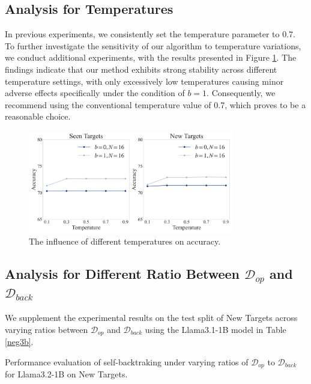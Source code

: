 \documentclass{article}
\theoremstyle{plain}
\theoremstyle{definition}
\theoremstyle{remark}
\begin{document}
\subsection{Analysis for Temperatures}
\label{app:temp}
 In previous experiments, we consistently set the temperature parameter to 0.7. To further investigate the sensitivity of our algorithm to temperature variations, we conduct additional experiments, with the results presented in Figure \ref{fig:temperature}. The findings indicate that our method exhibits strong stability across different temperature settings, with only excessively low temperatures causing minor adverse effects specifically under the condition of $b=1$. Consequently, we recommend using the conventional temperature value of 0.7, which proves to be a reasonable choice.
\begin{figure}[htbp]
  \centering
\includegraphics[width=0.8\textwidth]{fig/temperature.png}
  \caption{The influence of different temperatures on accuracy.}
  \label{fig:temperature}
\end{figure}

\subsection{Analysis for Different Ratio Between $\mathcal{D}_{op}$ and $\mathcal{D}_{back}$}
We supplement the experimental results on the test split of New Targets across varying ratios between $\mathcal{D}_{op}$ and $\mathcal{D}_{back}$ using the Llama3.1-1B model in Table \ref{neg3b}.

\begin{table}[htbp]
\centering
\caption{Performance evaluation of self-backtraking under varying ratios of $\mathcal{D}_{op}$ to $\mathcal{D}_{back}$ for Llama3.2-1B on New Targets.}
\label{neg3b}

\end{table}
\end{document}
